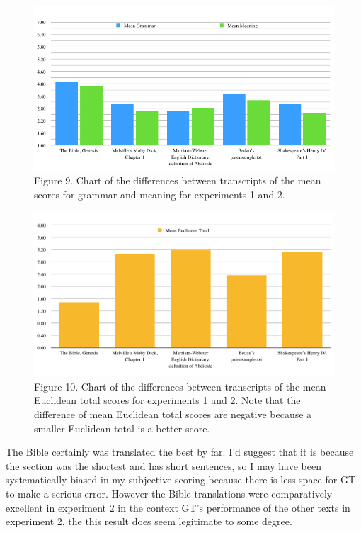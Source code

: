 \documentclass{article}
\begin{document}
\begin{figure}[h]
\centering
\includegraphics[width=15cm,keepaspectratio]{images/trans-diffs-grammar-meaning-chart.png}
\captionsetup{labelformat=empty} \caption{Figure 9. Chart of the differences between transcripts of the mean scores for grammar and meaning for experiments 1 and 2.}
\end{figure}

\begin{figure}[h]
\centering
\includegraphics[width=15cm,keepaspectratio]{images/trans-diffs-euclid-chart.png}
\captionsetup{labelformat=empty} \caption{Figure 10. Chart of the differences between transcripts of the mean Euclidean total scores for experiments 1 and 2. Note that the difference of mean Euclidean total scores are negative because a smaller Euclidean total is a better score.}
\end{figure}



The Bible certainly was translated the best by far. I'd suggest that it is because the section was the shortest and has short sentences, so I may have been systematically biased in my subjective scoring because there is less space for GT to make a serious error. However the Bible translations were comparatively excellent in experiment 2 in the context GT's performance of the other texts in experiment 2, the this result does seem legitimate to some degree.
\end{document}
